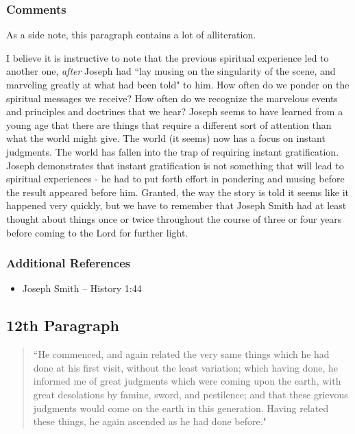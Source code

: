 \documentclass[12pt]{report}
\begin{document}
\subsubsection{Comments\label{js:comments11}}
As a side note, this paragraph contains a lot of alliteration.

I believe it is instructive to note that the previous spiritual experience led to another one, \emph{after} Joseph had ``lay musing on the singularity of the scene, and marveling greatly at what had been told" to him.  How often do we ponder on the spiritual messages we receive?  How often do we recognize the marvelous events and principles and doctrines that we hear?  Joseph seems to have learned from a young age that there are things that require a different sort of attention than what the world might give.  The world (it seems) now has a focus on instant judgments.  The world has fallen into the trap of requiring instant gratification.  Joseph demonstrates that instant gratification is not something that will lead to spiritual experiences - he had to put forth effort in pondering and musing before the result appeared before him.  Granted, the way the story is told it seems like it happened very quickly, but we have to remember that Joseph Smith had at least thought about things once or twice throughout the course of three or four years before coming to the Lord for further light.

\subsubsection{Additional References\label{js:reference11}}
\begin{itemize}
\item Joseph Smith -- History 1:44
\end{itemize}

\subsection{12th Paragraph\label{js:12th}}
\begin{center}
\begin{quote}
``He commenced, and again related the very same things which he had done at his first visit, without the least variation; which having done, he informed me of great judgments which were coming upon the earth, with great desolations by famine, sword, and pestilence; and that these grievous judgments would come on the earth in this generation.  Having related these things, he again ascended as he had done before."
\end{quote}
\end{center}
\end{document}

